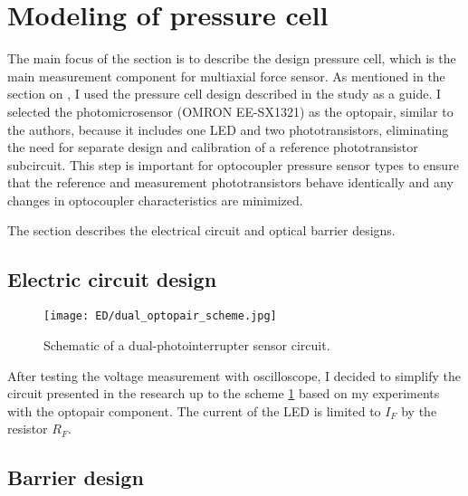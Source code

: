 \section{Modeling of pressure cell}
\label{section:presure_cell_electic_circuit}

The main focus of the section is to describe the design pressure cell, which is the main measurement component for multiaxial force sensor.
As mentioned in the section on , I used the pressure cell design described in the study \cite{my_love_pressure_photosensor} as a guide. 
I selected the photomicrosensor (OMRON EE-SX1321) as the optopair, similar to the authors, because it includes one LED and two phototransistors, 
eliminating the need for separate design and calibration of a reference phototransistor subcircuit. 
This step is important for optocoupler pressure sensor types to ensure that the reference and measurement phototransistors behave identically and any changes in optocoupler characteristics are minimized.

The section describes the electrical circuit and optical barrier designs.

\subsection{Electric circuit design}

\begin{figure}[H]
    \centering
    \texttt{[image: ED/dual\_optopair\_scheme.jpg]}
    \label{fig:optopair_scheme}
    \caption{Schematic of a dual-photointerrupter sensor circuit.}
  \end{figure}

After testing the voltage measurement with oscilloscope, 
I decided to simplify the circuit presented in the research \cite{my_love_pressure_photosensor} up to the scheme \ref{fig:optopair_scheme} based on my experiments with the optopair component.
The current of the LED is limited to $I_F$ by the resistor $R_F$. %

\subsection{Barrier design}

